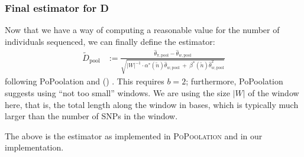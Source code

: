 \documentclass[a4paper,fontsize=9pt,DIV=14]{scrartcl}
\newcounter{todo}
\newcommand\todo[1]{}
\newcommand\toolname{\textsc}
\newcommand\citeay[1]{\citeauthor{#1} (\citeyear{#1}) \cite{#1}}
\begin{document}
\subsubsection*{Final estimator for D}

Now that we have a way of computing a reasonable value for the number of individuals sequenced,
we can finally define the estimator:
%
\begin{align}
    \tilde{D}_\text{pool} &:=
    \frac{
        \widehat{\theta}_{\pi, \text{pool}} - \widehat{\theta}_{w, \text{pool}}
            }{
        \sqrt{ {|W|}^{-1} \cdot \alpha^*(\tilde{n}) \widehat{\theta}_{w, \text{pool}} ~+~ \beta^*(\tilde{n}) \widehat{\theta}_{w, \text{pool}}^2 }
    }
\end{align}
%
following PoPoolation and \citeay{Achaz2008}.
This requires $b=2$; furthermore, PoPoolation suggests using ``not too small'' windows.
We are using the size $|W|$ of the window here, that is, the total length along the window in bases, which is typically much larger than the number of SNPs in the window. 

\todo{UNRESOLVED ISSUE: That is what i get from their code. Is that the correct term to use here? should it be the number of SNPs in the window instead?  JPS: I have no idea.  I would need to go through the Achaz paper in some detail to figure it out.  My guess is number of SNPs is right.}

The above is the estimator as implemented in \toolname{PoPoolation} and in our implementation.


\end{document}
